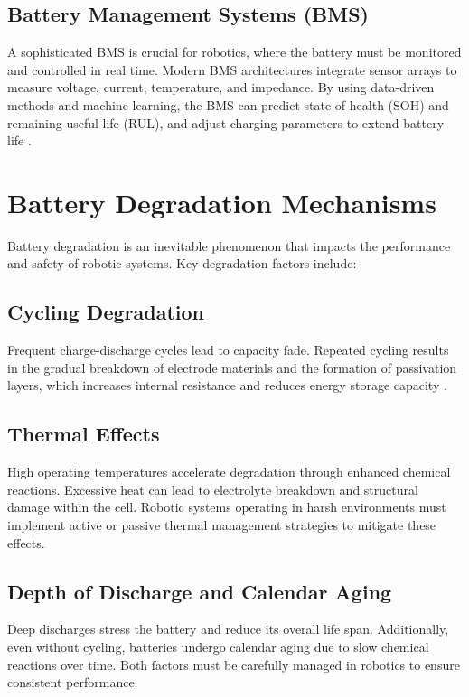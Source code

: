 \subsection{Battery Management Systems (BMS)}
A sophisticated BMS is crucial for robotics, where the battery must be monitored and controlled in real time. Modern BMS architectures integrate sensor arrays to measure voltage, current, temperature, and impedance. By using data-driven methods and machine learning, the BMS can predict state-of-health (SOH) and remaining useful life (RUL), and adjust charging parameters to extend battery life \cite{Rahman2024}.

\section{Battery Degradation Mechanisms}
Battery degradation is an inevitable phenomenon that impacts the performance and safety of robotic systems. Key degradation factors include:

\subsection{Cycling Degradation}

Frequent charge-discharge cycles lead to capacity fade. Repeated cycling results in the gradual breakdown of electrode materials and the formation of passivation layers, which increases internal resistance and reduces energy storage capacity \cite{Roscher2011}.

\subsection{Thermal Effects}
High operating temperatures accelerate degradation through enhanced chemical reactions. Excessive heat can lead to electrolyte breakdown and structural damage within the cell. Robotic systems operating in harsh environments must implement active or passive thermal management strategies to mitigate these effects.

\subsection{Depth of Discharge and Calendar Aging}
Deep discharges stress the battery and reduce its overall life span. Additionally, even without cycling, batteries undergo calendar aging due to slow chemical reactions over time. Both factors must be carefully managed in robotics to ensure consistent performance.

